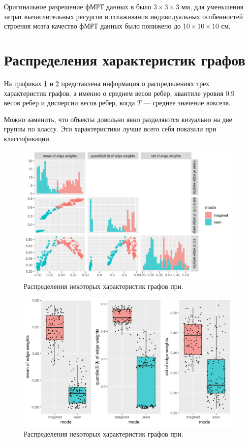 \documentclass[specialist,
substylefile = spbu_report.rtx,
subf,href,colorlinks=true, 12pt]{disser}
\begin{document}
			Оригинальное разрешение фМРТ данных в было $3 \times 3 \times 3$ мм, для уменьшения затрат вычислительных ресурсов и сглаживания индивидуальных особенностей строения мозга качество фМРТ данных было понижено до $10 \times 10 \times 10$ см.
	
		\section{Распределения характеристик графов}
			На графиках \ref{fg:3} и \ref{fg:4} представлена информация о распределениях трех характеристик графов, а именно о среднем весов ребер, квантиле уровня $0.9$ весов ребер и дисперсии весов ребер, когда $T$ --- среднее значение вокселя.
			
			Можно заменить, что объекты довольно явно разделяются визуально на две группы по классу. Эти характеристики лучше всего себя показали при классификации.
		
			\begin{figure}[h]
				\centering
				\includegraphics[width=15cm]{../images/graph_feachers_1.png}
				\caption{Распределения некоторых характеристик графов при.} 
				\label{fg:3}
			\end{figure}
		
			\begin{figure}[t!]
				\centering
				\includegraphics[width=15cm]{../images/graph_feachers_2.png}
				\caption{Распределения некоторых характеристик графов при.} 
				\label{fg:4}
			\end{figure}						 
		
\end{document}
